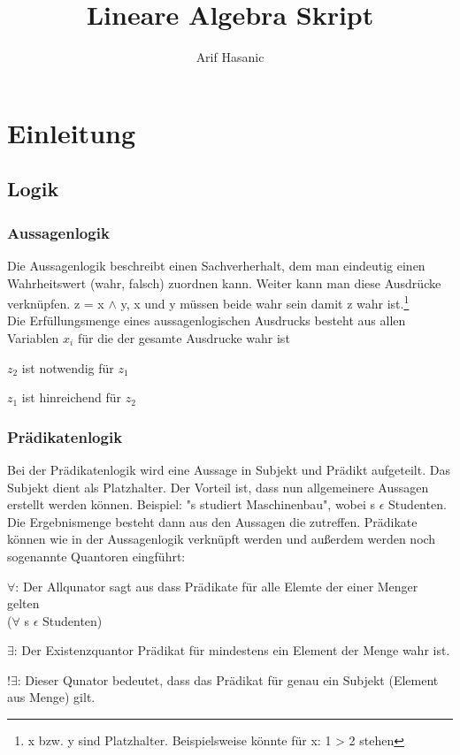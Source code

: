 \documentclass[a4paper,10pt]{scrartcl}
\title{Lineare Algebra Skript}
\author{Arif Hasanic}
\begin{document}
    \maketitle
    \newpage
    \tableofcontents
    \newpage

    \section{Einleitung}
        \subsection{Logik}
        \subsubsection{Aussagenlogik}
        Die Aussagenlogik beschreibt einen Sachverherhalt, dem man eindeutig einen 
        Wahrheitswert (wahr, falsch) zuordnen kann. Weiter kann man diese Ausdrücke verknüpfen. 
        z = x $\wedge$ y,   x und y müssen beide wahr sein damit z wahr ist.\footnote{x bzw. y sind Platzhalter. Beispielsweise könnte für x: 1 > 2 stehen} \\
        Die Erfüllungsmenge eines aussagenlogischen Ausdrucks besteht aus allen Variablen $x_i$ für die der gesamte Ausdrucke wahr ist
        \begin{description}
            \item[$z_1 \Rightarrow z_2$]
            \item $z_2$ ist notwendig für $z_1$ 
            \item $z_1$ ist hinreichend für $z_2$
        \end{description}

        \subsubsection{Prädikatenlogik}
        Bei der Prädikatenlogik wird eine Aussage in Subjekt und Prädikt aufgeteilt. Das Subjekt dient als Platzhalter. Der Vorteil ist, dass nun 
        allgemeinere Aussagen erstellt werden können. Beispiel: "s studiert Maschinenbau", wobei s $\epsilon$ Studenten. \\
        Die Ergebnismenge besteht dann aus den Aussagen die zutreffen. Prädikate können wie in der Aussagenlogik verknüpft werden und außerdem werden noch sogenannte
        Quantoren eingführt:
        \begin{description}
            \item $\forall$: Der Allqunator sagt aus dass  Prädikate für alle Elemte der einer Menger gelten \\($\forall$ s $\epsilon$ Studenten)
            \item $\exists$: Der Existenzquantor Prädikat für mindestens ein Element der Menge wahr ist.
            \item $!\exists$: Dieser Qunator bedeutet, dass das Prädikat für genau ein Subjekt (Element aus Menge) gilt.
        \end{description} 
\end{document}
